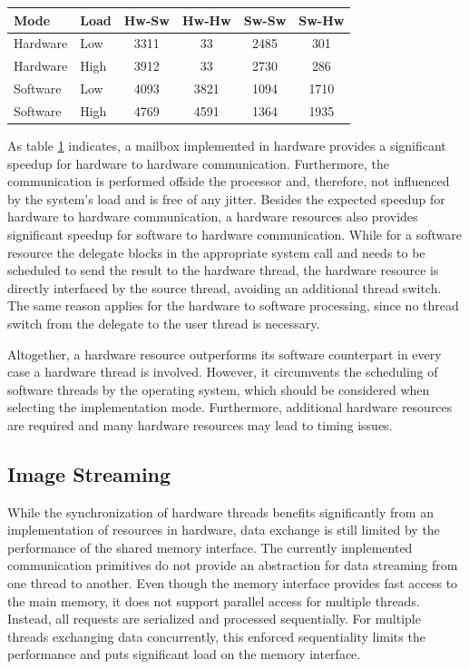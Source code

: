 \begin{table}
	\scriptsize
	\centering
	\label{tab:mbox_turn}
	\begin{tabular}{llcccc}
	\hline
	\textbf{Mode} & \textbf{Load} & \textbf{Hw-Sw} & \textbf{Hw-Hw} & \textbf{Sw-Sw} & \textbf{Sw-Hw}\\
	\hline
	Hardware & Low & 3311 & 33 & 2485 & 301\\
	Hardware & High & 3912 & 33 & 2730 & 286\\
	Software & Low & 4093 & 3821 & 1094 & 1710\\
	Software & High & 4769 & 4591 & 1364 & 1935\\
	\hline
	\end{tabular}
\end{table}
As table \ref{tab:mbox_turn} indicates, a mailbox implemented in hardware
provides a significant speedup for hardware to hardware communication.
Furthermore, the communication is performed offside the processor and,
therefore, not influenced by the system's load and is free of any jitter.
Besides the expected speedup for hardware to hardware communication, a
hardware resources also provides significant speedup for software to hardware
communication. While for a software resource the delegate blocks in the
appropriate system call and needs to be scheduled to send the result to the
hardware thread, the hardware resource is directly interfaced by the source
thread, avoiding an additional thread switch. The same reason applies for the
hardware to software processing, since no thread switch from the delegate to
the user thread is necessary.

Altogether, a hardware resource outperforms its software counterpart in
every case a hardware thread is involved. However, it circumvents the
scheduling of software threads by the operating system, which should be
considered when selecting the implementation mode. Furthermore, additional
hardware resources are required and many hardware resources may lead to timing
issues.

\subsection{Image Streaming}
While the synchronization of hardware threads benefits significantly from an
implementation of resources in hardware, data exchange is still limited by the
performance of the shared memory interface. The currently implemented
communication primitives do not provide an abstraction for data streaming
from one thread to another. Even though the memory interface provides fast
access to the main memory, it does not support parallel access for multiple
threads. Instead, all requests are serialized and processed sequentially. For
multiple threads exchanging data concurrently, this enforced sequentiality
limits the performance and puts significant load on the memory interface.

